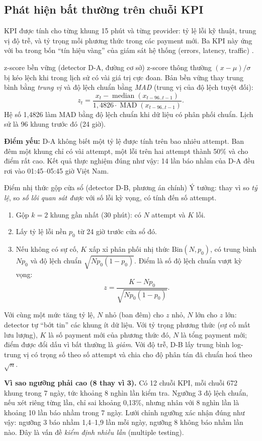 \documentclass[11pt,a4paper]{article}
\begin{document}
\subsection{Phát hiện bất thường trên chuỗi KPI}

KPI được tính cho từng khung 15 phút và từng provider: tỷ lệ lỗi kỹ thuật, trung vị độ trễ, và tỷ trọng mỗi phương thức trong các payment mới. Ba KPI này ứng với ba trong bốn ``tín hiệu vàng'' của giám sát hệ thống (errors, latency, traffic) \cite{sre}.

\begin{explain}{z-score bền vững (detector D-A, đường cơ sở)}
z-score thông thường $(x-\mu)/\sigma$ bị kéo lệch khi trong lịch sử có vài giá trị cực đoan. Bản bền vững thay trung bình bằng \emph{trung vị} và độ lệch chuẩn bằng \emph{MAD} (trung vị của độ lệch tuyệt đối):
\[
z_t=\frac{x_t-\operatorname{median}(x_{t-96..t-1})}{1{,}4826\cdot\operatorname{MAD}(x_{t-96..t-1})}.
\]
Hệ số 1,4826 làm MAD bằng độ lệch chuẩn khi dữ liệu có phân phối chuẩn. Lịch sử là 96 khung trước đó (24 giờ).

\textbf{Điểm yếu:} D-A không biết một tỷ lệ được tính trên bao nhiêu attempt. Ban đêm một khung chỉ có vài attempt, một lỗi trên hai attempt thành 50\% và cho điểm rất cao. Kết quả thực nghiệm đúng như vậy: 14 lần báo nhầm của D-A đều rơi vào 01:45--05:45 giờ Việt Nam.
\end{explain}

\begin{explain}{Điểm nhị thức gộp cửa sổ (detector D-B, phương án chính)}
Ý tưởng: thay vì so \emph{tỷ lệ}, so \emph{số lỗi quan sát được} với số lỗi kỳ vọng, có tính đến số attempt.
\begin{enumerate}
  \item Gộp $k=2$ khung gần nhất (30 phút): có $N$ attempt và $K$ lỗi.
  \item Lấy tỷ lệ lỗi nền $p_0$ từ 24 giờ trước cửa sổ đó.
  \item Nếu không có sự cố, $K$ xấp xỉ phân phối nhị thức $\mathrm{Bin}(N,p_0)$, có trung bình $Np_0$ và độ lệch chuẩn $\sqrt{Np_0(1-p_0)}$. Điểm là số độ lệch chuẩn vượt kỳ vọng:
  \[
  z=\frac{K-Np_0}{\sqrt{Np_0(1-p_0)}}.
  \]
\end{enumerate}
Với cùng một mức tăng tỷ lệ, $N$ nhỏ (ban đêm) cho $z$ nhỏ, $N$ lớn cho $z$ lớn: detector tự ``bớt tin'' các khung ít dữ liệu. Với tỷ trọng phương thức (sự cố mất lưu lượng), $K$ là số payment mới của phương thức đó, $N$ là tổng payment mới; điểm được đổi dấu vì bất thường là \emph{giảm}. Với độ trễ, D-B lấy trung bình log-trung vị có trọng số theo số attempt và chia cho độ phân tán đã chuẩn hoá theo $\sqrt{n}$.

\textbf{Vì sao ngưỡng phải cao (8 thay vì 3).} Có 12 chuỗi KPI, mỗi chuỗi 672 khung trong 7 ngày, tức khoảng 8 nghìn lần kiểm tra. Ngưỡng 3 độ lệch chuẩn, nếu xét riêng từng lần, chỉ sai khoảng 0,13\%, nhưng nhân với 8 nghìn lần là khoảng 10 lần báo nhầm trong 7 ngày. Lưới chỉnh ngưỡng xác nhận đúng như vậy: ngưỡng 3 báo nhầm 1,4--1,9 lần mỗi ngày, ngưỡng 8 không báo nhầm lần nào. Đây là vấn đề \emph{kiểm định nhiều lần} (multiple testing).
\end{explain}
\end{document}
